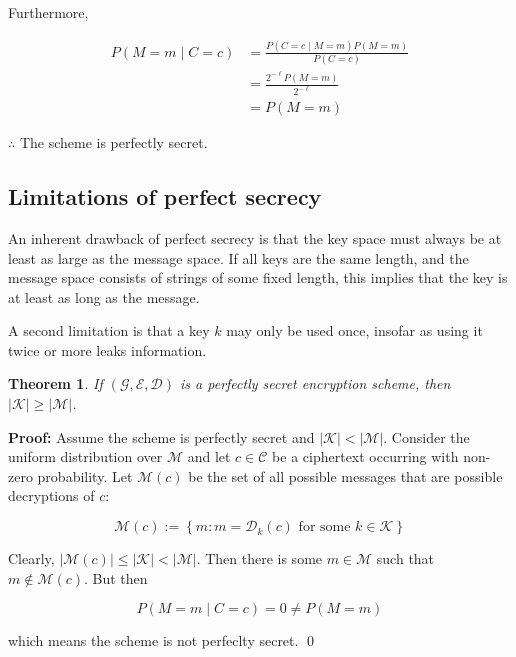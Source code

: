 \documentclass[a4paper, 12pt]{article}
\newtheorem{theorem}{Theorem}
\newtheorem{theorem}{Theorem}
\newenvironment{proof}[1][Proof]{\par\small\noindent\textbf{#1:} }{\qed\par\normalsize}
\begin{document}
Furthermore, 

\begin{align*}
    P\left( M = m \mid C = c \right)  &= \frac{ P\left( C = c \mid M = m \right) P(M = m)  }{P(C = c)} \\ 
                                      &= \frac{  2^{-\ell}  P(M = m) }{2^{-\ell}} \\ 
                                      &= P(M = m)
\end{align*}

$\therefore $ The scheme is perfectly secret.


\subsection{Limitations of perfect secrecy}

An inherent drawback of perfect secrecy is that the key space must always 
be at least as large as the message space. If all keys are the same length, and the 
message space consists of strings of some fixed length, this implies that the key 
is at least as long as the message. 

A second limitation is that a key $k$ may only be used once, insofar as using it 
twice or more leaks information.

\begin{theorem}
    If $(\mathcal{G}, \mathcal{E}, \mathcal{D})$ is a perfectly secret encryption 
    scheme, then $|\mathcal{K}| \geq |\mathcal{M}|$.
\end{theorem}

\begin{proof}
    Assume the scheme is perfectly secret and $\left| \mathcal{K} \right| < \left| \mathcal{M} \right| $. Consider the uniform distribution over $\mathcal{M}$ and let 
    $c \in \mathcal{C}$ be a ciphertext occurring with non-zero probability. Let 
    $\mathcal{M}(c)$ be the set of all possible messages that are 
    possible decryptions of $c$:

    \begin{equation*}
        \mathcal{M}(c) := \left\{ m : m = \mathcal{D}_k(c) \text{ for some } k \in \mathcal{K} \right\} 
    \end{equation*}

    Clearly, $\left| \mathcal{M}(c) \right| \leq \left| \mathcal{K} \right| < \left| \mathcal{M} \right|   $. 
    Then there is some $m \in \mathcal{M}$
    such that $m \not\in \mathcal{M}(c)$. But then 

    \begin{equation*}
        P(M = m \mid C = c) = 0 \neq P(M = m)
    \end{equation*}

    which means the scheme is not perfeclty secret.
\end{proof}
\end{document}

